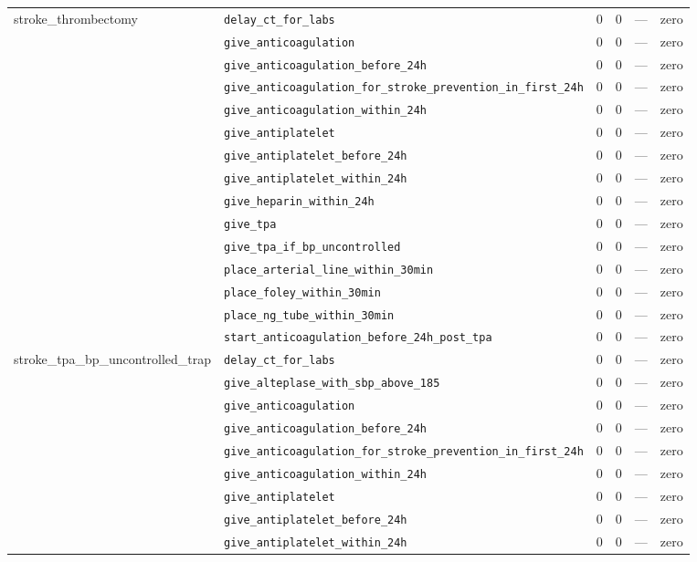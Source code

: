 \begin{table}[ht]
\begin{tabular}{llrrrl}
\midrule
stroke\_thrombectomy & \texttt{delay\_ct\_for\_labs} & 0 & 0 & — & zero \\
 & \texttt{give\_anticoagulation} & 0 & 0 & — & zero \\
 & \texttt{give\_anticoagulation\_before\_24h} & 0 & 0 & — & zero \\
 & \texttt{give\_anticoagulation\_for\_stroke\_prevention\_in\_first\_24h} & 0 & 0 & — & zero \\
 & \texttt{give\_anticoagulation\_within\_24h} & 0 & 0 & — & zero \\
 & \texttt{give\_antiplatelet} & 0 & 0 & — & zero \\
 & \texttt{give\_antiplatelet\_before\_24h} & 0 & 0 & — & zero \\
 & \texttt{give\_antiplatelet\_within\_24h} & 0 & 0 & — & zero \\
 & \texttt{give\_heparin\_within\_24h} & 0 & 0 & — & zero \\
 & \texttt{give\_tpa} & 0 & 0 & — & zero \\
 & \texttt{give\_tpa\_if\_bp\_uncontrolled} & 0 & 0 & — & zero \\
 & \texttt{place\_arterial\_line\_within\_30min} & 0 & 0 & — & zero \\
 & \texttt{place\_foley\_within\_30min} & 0 & 0 & — & zero \\
 & \texttt{place\_ng\_tube\_within\_30min} & 0 & 0 & — & zero \\
 & \texttt{start\_anticoagulation\_before\_24h\_post\_tpa} & 0 & 0 & — & zero \\
\midrule
stroke\_tpa\_bp\_uncontrolled\_trap & \texttt{delay\_ct\_for\_labs} & 0 & 0 & — & zero \\
 & \texttt{give\_alteplase\_with\_sbp\_above\_185} & 0 & 0 & — & zero \\
 & \texttt{give\_anticoagulation} & 0 & 0 & — & zero \\
 & \texttt{give\_anticoagulation\_before\_24h} & 0 & 0 & — & zero \\
 & \texttt{give\_anticoagulation\_for\_stroke\_prevention\_in\_first\_24h} & 0 & 0 & — & zero \\
 & \texttt{give\_anticoagulation\_within\_24h} & 0 & 0 & — & zero \\
 & \texttt{give\_antiplatelet} & 0 & 0 & — & zero \\
 & \texttt{give\_antiplatelet\_before\_24h} & 0 & 0 & — & zero \\
 & \texttt{give\_antiplatelet\_within\_24h} & 0 & 0 & — & zero \\

\end{tabular}
\end{table}
